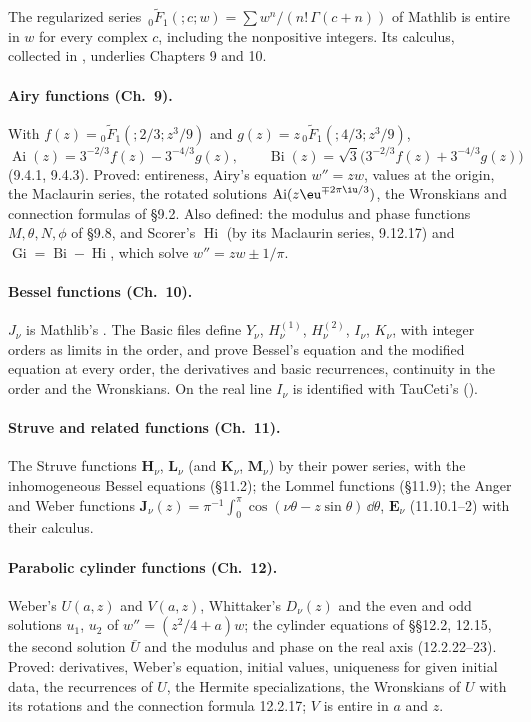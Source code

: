 \documentclass[11pt,a4paper]{article}
\begin{document}
The regularized series $\,{}_0\tilde F_1(;c;w)=\sum w^n/(n!\,\Gamma(c+n))$ of Mathlib is entire
in $w$ for every complex $c$, including the nonpositive integers. Its calculus, collected in
, underlies Chapters 9 and 10.

\paragraph{Airy functions (Ch.~9).} With $f(z)={}_0\tilde F_1(;2/3;z^3/9)$ and
$g(z)=z\,{}_0\tilde F_1(;4/3;z^3/9)$,
\[
  \operatorname{Ai}(z)=3^{-2/3}f(z)-3^{-4/3}g(z),\qquad
  \operatorname{Bi}(z)=\sqrt3\bigl(3^{-2/3}f(z)+3^{-4/3}g(z)\bigr)
\]
(9.4.1, 9.4.3). Proved: entireness, Airy's equation $w''=zw$, values at the origin, the
Maclaurin series, the rotated solutions $\operatorname{Ai}(z\eu^{\mp2\pi\iu/3})$, the Wronskians
and connection formulas of \S9.2. Also defined: the modulus and phase functions $M,\theta,N,\phi$
of \S9.8, and Scorer's $\operatorname{Hi}$ (by its Maclaurin series, 9.12.17) and
$\operatorname{Gi}=\operatorname{Bi}-\operatorname{Hi}$, which solve $w''=zw\pm1/\pi$.

\paragraph{Bessel functions (Ch.~10).} $J_\nu$ is Mathlib's . The Basic
files define $Y_\nu$, $H^{(1)}_\nu$, $H^{(2)}_\nu$, $I_\nu$, $K_\nu$, with integer orders as
limits in the order, and prove Bessel's equation and the modified equation at every order, the
derivatives and basic recurrences, continuity in the order and the Wronskians. On the real
line $I_\nu$ is identified with TauCeti's 
().

\paragraph{Struve and related functions (Ch.~11).} The Struve functions $\mathbf H_\nu$,
$\mathbf L_\nu$ (and $\mathbf K_\nu$, $\mathbf M_\nu$) by their power series, with the
inhomogeneous Bessel equations (\S11.2); the Lommel functions (\S11.9); the Anger and Weber
functions $\mathbf J_\nu(z)=\pi^{-1}\int_0^\pi\cos(\nu\theta-z\sin\theta)\,\dd\theta$,
$\mathbf E_\nu$ (11.10.1--2) with their calculus.

\paragraph{Parabolic cylinder functions (Ch.~12).} Weber's $U(a,z)$ and $V(a,z)$, Whittaker's
$D_\nu(z)$ and the even and odd solutions $u_1$, $u_2$ of $w''=(z^2/4+a)w$; the cylinder
equations of \S\S12.2, 12.15, the second solution $\bar U$ and the modulus and phase on the real
axis (12.2.22--23). Proved: derivatives, Weber's equation, initial values, uniqueness for given
initial data, the recurrences of $U$, the Hermite specializations, the Wronskians of $U$ with
its rotations and the connection formula 12.2.17; $V$ is entire in $a$ and $z$.
\end{document}
